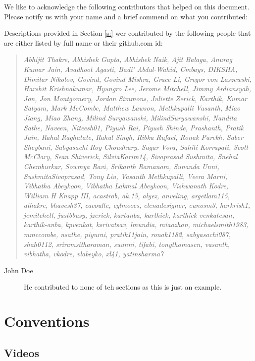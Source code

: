 We like to acknowledge the following contributors that helped on this
document. Please notify us with your name and a brief commend on what
you contributed:

Descriptions provided in Section \ref{s:} wer contributed by the
following people that are either listed by full name or their
github.com id:

\begin{quotation}{\em
Abhijit Thakre, Abhishek Gupta, Abhishek Naik, Ajit Balaga, Anurag
Kumar Jain, Avadhoot Agasti, Badi' Abdul-Wahid, Cmbays, DIKSHA,
Dimitar Nikolov, Govind, Govind Mishra, Grace Li, Gregor von
Laszewski, Harshit Krishnakumar, Hyungro Lee, Jerome Mitchell, Jimmy
Ardiansyah, Jon, Jon Montgomery, Jordan Simmons, Juliette Zerick,
Karthik, Kumar Satyam, Mark McCombe, Matthew Lawson, Methkupalli
Vasanth, Miao Jiang, Miao Zhang, Milind Suryawanshi,
MilindSuryawanshi, Nandita Sathe, Naveen, Niteesh01, Piyush Rai,
Piyush Shinde, Prashanth, Pratik Jain, Rahul Raghatate, Rahul Singh,
Ribka Rufael, Ronak Parekh, Saber Sheybani, Sabyasachi Roy Choudhury,
Sagar Vora, Sahiti Korrapati, Scott McClary, Sean Shiverick,
SilviaKarim14, Sivaprasad Sushmita, Snehal Chemburkar, Sowmya Ravi,
Srikanth Ramanam, Sunanda Unni, SushmitaSivaprasad, Tony Liu, Vasanth
Methkupalli, Veera Marni, Vibhatha Abeykoon, Vibhatha Lakmal Abeykoon,
Vishwanath Kodre, William H Knapp III, acastrob, ak.15, alyez,
anveling, argetlam115, athakre, bhavesh37, cacoulte, cglmoocs,
elenadesigner, eunosm3, harkrish1, jemitchell, justbbusy, jzerick,
kartanba, karthick, karthick venkatesan, karthik-anba, kpvenkat,
ksrivatsav, lmundia, miaozhan, michaelsmith1983, mmccombe, nsathe,
piyurai, pratik11jain, ronak1182, sabyasachi087,
shah0112, sriramsitharaman, suunni, tifabi, tonythomascn, vasanth,
vibhatha, vkodre, vlabeyko, xl41, yatinsharma7
}\end{quotation}

\begin{description}
\item[John Doe] He contributed to none of teh sections as this is just
  an example.
\end{description}

\section{Conventions}

\subsection{Videos}

